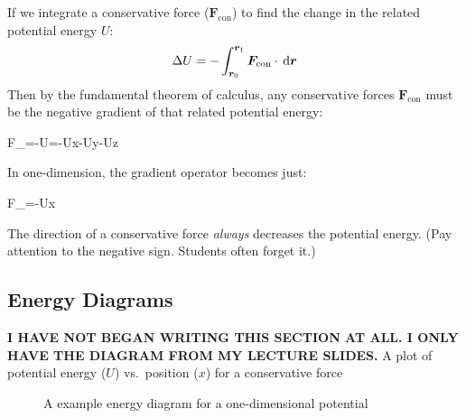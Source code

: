 If we integrate a conservative force ($\bm F_\text{con}$) to find the change in
the related potential energy $U$:
\begin{equation*}
  \Delta U=-\int_{\bm r_0}^{\bm r_1}\bm F_\text{con}\cdot\dl{\bm r}
\end{equation*}
Then by the fundamental theorem of calculus, any conservative forces
$\bm F_\text{con}$ must be the negative gradient of that related potential
energy:
\begin{important-equation}
  \bm F_=-\nabla U=-\diffp Ux\iii-\diffp Uy\jjj-\diffp Uz\kkk
\end{important-equation}
In one-dimension, the gradient operator becomes just:
\begin{important-equation}
  F_=-\diff Ux
\end{important-equation}
The direction of a conservative force \emph{always} decreases the potential
energy. (Pay attention to the negative sign. Students often forget it.)



\subsection{Energy Diagrams}
\textbf{I HAVE NOT BEGAN WRITING THIS SECTION AT ALL. I ONLY HAVE THE DIAGRAM
  FROM MY LECTURE SLIDES.}
A plot of potential energy ($U$) vs.\ position ($x$) for a conservative force
\begin{figure}[ht]
  \centering
  \caption{A example energy diagram for a one-dimensional potential}
  \label{fig:energy-diagram}
\end{figure}


